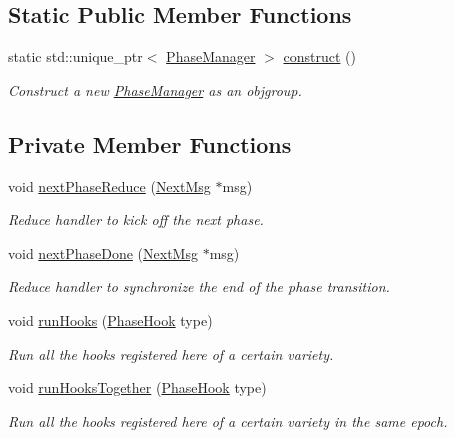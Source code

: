 \subsection*{Static Public Member Functions}
\begin{DoxyCompactItemize}
\item 
static std\+::unique\+\_\+ptr$<$ \hyperlink{structvt_1_1phase_1_1_phase_manager}{Phase\+Manager} $>$ \hyperlink{structvt_1_1phase_1_1_phase_manager_a6d864be02daa1cc0ec0b336aa1ebc31e}{construct} ()
\begin{DoxyCompactList}\small\item\em Construct a new {\ttfamily \hyperlink{structvt_1_1phase_1_1_phase_manager}{Phase\+Manager}} as an objgroup. \end{DoxyCompactList}\end{DoxyCompactItemize}
\subsection*{Private Member Functions}
\begin{DoxyCompactItemize}
\item 
void \hyperlink{structvt_1_1phase_1_1_phase_manager_a59345a6496fb1413de1a1899fe4532cf}{next\+Phase\+Reduce} (\hyperlink{structvt_1_1phase_1_1_next_msg}{Next\+Msg} $\ast$msg)
\begin{DoxyCompactList}\small\item\em Reduce handler to kick off the next phase. \end{DoxyCompactList}\item 
void \hyperlink{structvt_1_1phase_1_1_phase_manager_aa8db0caf0fcef7fe3ead90de2adda963}{next\+Phase\+Done} (\hyperlink{structvt_1_1phase_1_1_next_msg}{Next\+Msg} $\ast$msg)
\begin{DoxyCompactList}\small\item\em Reduce handler to synchronize the end of the phase transition. \end{DoxyCompactList}\item 
void \hyperlink{structvt_1_1phase_1_1_phase_manager_aeeb5b14ac179b2400a52914208bbd922}{run\+Hooks} (\hyperlink{namespacevt_1_1phase_aec9a63fdd99680d7a7fe99d321193811}{Phase\+Hook} type)
\begin{DoxyCompactList}\small\item\em Run all the hooks registered here of a certain variety. \end{DoxyCompactList}\item 
void \hyperlink{structvt_1_1phase_1_1_phase_manager_aa61710b25b47f56713d3eec68e7ce6f6}{run\+Hooks\+Together} (\hyperlink{namespacevt_1_1phase_aec9a63fdd99680d7a7fe99d321193811}{Phase\+Hook} type)
\begin{DoxyCompactList}\small\item\em Run all the hooks registered here of a certain variety in the same epoch. \end{DoxyCompactList}\end{DoxyCompactItemize}

